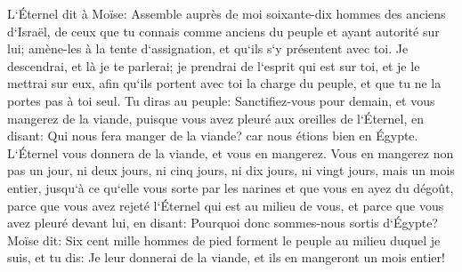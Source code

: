 \verse L`Éternel dit à Moïse: Assemble auprès de moi soixante-dix hommes des anciens d`Israël, de ceux que tu connais comme anciens du peuple et ayant autorité sur lui; amène-les à la tente d`assignation, et qu`ils s`y présentent avec toi. 
\verse Je descendrai, et là je te parlerai; je prendrai de l`esprit qui est sur toi, et je le mettrai sur eux, afin qu`ils portent avec toi la charge du peuple, et que tu ne la portes pas à toi seul. 
\verse Tu diras au peuple: Sanctifiez-vous pour demain, et vous mangerez de la viande, puisque vous avez pleuré aux oreilles de l`Éternel, en disant: Qui nous fera manger de la viande? car nous étions bien en Égypte. L`Éternel vous donnera de la viande, et vous en mangerez. 
\verse Vous en mangerez non pas un jour, ni deux jours, ni cinq jours, ni dix jours, ni vingt jours, 
\verse mais un mois entier, jusqu`à ce qu`elle vous sorte par les narines et que vous en ayez du dégoût, parce que vous avez rejeté l`Éternel qui est au milieu de vous, et parce que vous avez pleuré devant lui, en disant: Pourquoi donc sommes-nous sortis d`Égypte? 
\verse Moïse dit: Six cent mille hommes de pied forment le peuple au milieu duquel je suis, et tu dis: Je leur donnerai de la viande, et ils en mangeront un mois entier! 
